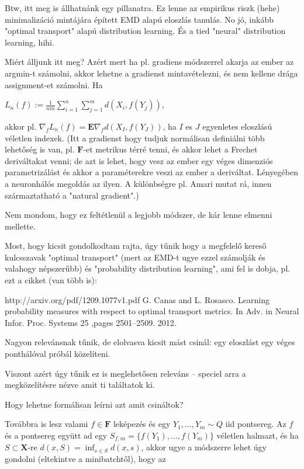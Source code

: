 \documentclass[a4paper]{article}
\newcommand{\cF}{\mathbf{F}}
\newcommand{\cX}{\mathbf{X}}
\newcommand{\EE}{\mathbf{E}}
\begin{document}
Btw, itt meg is állhatnánk egy pillanatra. Ez lenne az empirikus riszk (hehe) minimalizáció mintájára épített EMD alapú eloszlás tanulás.
No jó, inkább "optimal transport" alapú distribution learning. És a tied "neural" distribution learning, hihi.

Miért álljunk itt meg? Azért mert ha pl. gradiens módszerrel akarja az ember az argmin-t számolni, akkor lehetne a gradienst mintavételezni, és nem kellene drága assignment-et számolni. Ha

$L_n(f) := \frac1{nm}\sum_{i=1}^n \sum_{j=1}^m d(X_i,f(Y_j)) $,

akkor pl. $\nabla_f L_n(f) = \EE{ \nabla_f d(X_{I},f(Y_J)) }$, ha $I$ es $J$ egyenletes eloszlású véletlen indexek. (Itt a gradienst hogy tudjuk normálisan definiálni több lehetőség is van, pl. $\cF$-et metrikus térré tenni, és akkor lehet a Frechet deriváltakat venni; de azt is lehet, hogy vesz az ember egy véges dimenziós parametrizálást és akkor a paraméterekre veszi az ember a deriváltat. Lényegében a neuronhálós megoldás az ilyen. A különbségre pl. Amari mutat rá, innen származtatható a "natural gradient".)

Nem mondom, hogy ez feltétlenül a legjobb módszer, de kár lenne elmenni mellette.

Most, hogy kicsit gondolkodtam rajta, úgy tűnik hogy a megfelelő kereső kulcsszavak "optimal transport" (mert az EMD-t ugye ezzel számolják és valahogy népszerűbb) és "probability distribution learning", ami fel is dobja, pl. ezt a cikket (van több is):

http://arxiv.org/pdf/1209.1077v1.pdf
G. Canas and L. Rosasco. Learning probability measures with respect to optimal transport metrics. In Adv. in Neural Infor. Proc. Systems 25 ,pages 2501–2509. 2012.

Nagyon relevánsnak tűnik, de elolvasva kicsit mást csinál: egy eloszlást egy véges ponthálóval próbál közelíteni.

Viszont azért úgy tűnik ez is meglehetősen releváns -- speciel arra a megközelítésre nézve amit ti találtatok ki.

Hogy lehetne formálisan leírni azt amit csináltok?

Továbbra is lesz valami $f\in \cF$ leképezés és egy $Y_1,\dots,Y_m\sim Q$ iid pontsereg.
Az $f$ és a pontsereg együtt ad egy $S_{f,m} = \{f(Y_1),\dots,f(Y_m)\}$ véletlen halmazt, és ha $S\subset \cX$-re $d(x,S) = \inf_{s\in S} d(x,s)$, akkor ugye a módszerre lehet úgy gondolni (eltekintve a minibatchtől), hogy az
\end{document}
